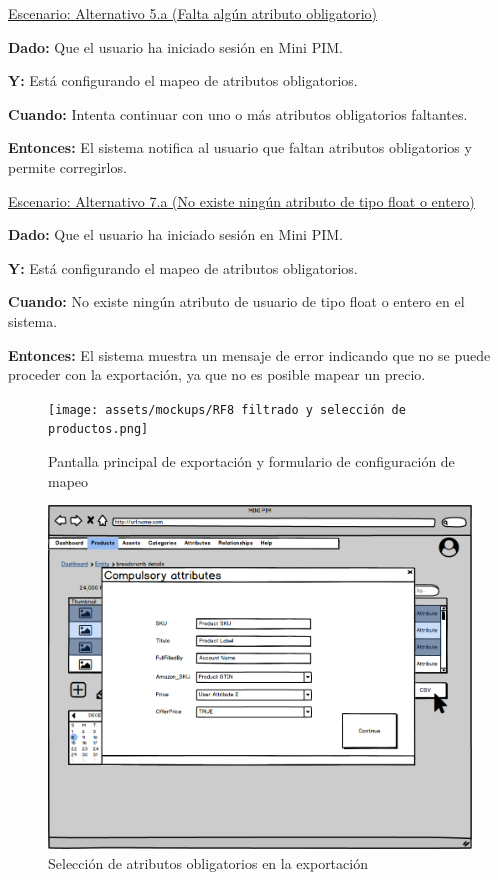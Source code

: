 \vspace{0.15cm}
\underline{Escenario: Alternativo 5.a (Falta algún atributo obligatorio)}\par
\textbf{Dado:} Que el usuario ha iniciado sesión en Mini PIM.  \par
\textbf{Y:} Está configurando el mapeo de atributos obligatorios.  \par
\textbf{Cuando:} Intenta continuar con uno o más atributos obligatorios faltantes.  \par
\textbf{Entonces:} El sistema notifica al usuario que faltan atributos obligatorios y permite corregirlos.\par
\vspace{0.15cm}
\underline{Escenario: Alternativo 7.a (No existe ningún atributo de tipo float o entero)}\par
\textbf{Dado:} Que el usuario ha iniciado sesión en Mini PIM.  \par
\textbf{Y:} Está configurando el mapeo de atributos obligatorios.  \par
\textbf{Cuando:} No existe ningún atributo de usuario de tipo float o entero en el sistema.  \par
\textbf{Entonces:} El sistema muestra un mensaje de error indicando que no se puede proceder con la exportación, ya que no es posible mapear un precio.\par

\begin{figure}[H]
    \texttt{[image: assets/mockups/RF8 filtrado y selección de productos.png]}
    \caption{Pantalla principal de exportación y formulario de configuración de mapeo}
\end{figure}


\begin{figure}[H]
    \includegraphics[width=1\linewidth]{assets/mockups/RF8 Seleccion de atributos obligatorios.png}
    \caption{Selección de atributos obligatorios en la exportación}
\end{figure}

